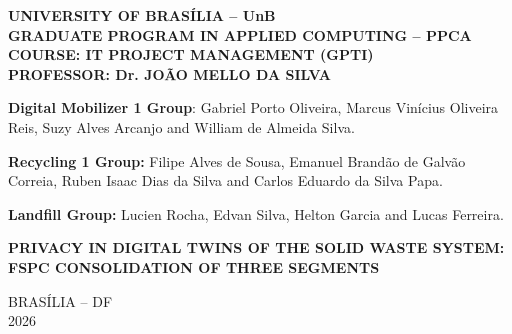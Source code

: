 \documentclass[12pt,a4paper,article,oneside,brazil,english]{abntex2}
\begin{document}
\thispagestyle{empty}
\noindent\begin{minipage}[t][0.92\textheight]{\textwidth}
\centering
\SingleSpacing
\textbf{UNIVERSITY OF BRASÍLIA -- UnB\\
GRADUATE PROGRAM IN APPLIED COMPUTING -- PPCA\\
COURSE: IT PROJECT MANAGEMENT (GPTI)\\
PROFESSOR: Dr. JOÃO MELLO DA SILVA}

\vspace{1cm}

\textbf{Digital Mobilizer 1 Group}: Gabriel Porto Oliveira, Marcus Vinícius Oliveira Reis, Suzy Alves Arcanjo and William de Almeida Silva.

\vspace{0.4cm}

\textbf{Recycling 1 Group:} Filipe Alves de Sousa, Emanuel Brandão de Galvão Correia, Ruben Isaac Dias da Silva and Carlos Eduardo da Silva Papa.

\vspace{0.4cm}

\textbf{Landfill Group:} Lucien Rocha, Edvan Silva, Helton Garcia and Lucas Ferreira.

\vspace{3cm}

\textbf{PRIVACY IN DIGITAL TWINS OF THE SOLID WASTE SYSTEM: FSPC CONSOLIDATION OF THREE SEGMENTS}

\vfill

BRASÍLIA -- DF\\
2026
\end{minipage}
\clearpage
\end{document}
